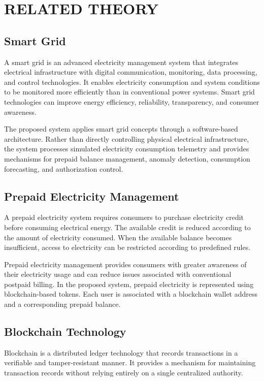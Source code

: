 \chapter{RELATED THEORY}

\section{Smart Grid}

A smart grid is an advanced electricity management system that integrates electrical infrastructure with digital communication, monitoring, data processing, and control technologies. It enables electricity consumption and system conditions to be monitored more efficiently than in conventional power systems. Smart grid technologies can improve energy efficiency, reliability, transparency, and consumer awareness.

The proposed system applies smart grid concepts through a software-based architecture. Rather than directly controlling physical electrical infrastructure, the system processes simulated electricity consumption telemetry and provides mechanisms for prepaid balance management, anomaly detection, consumption forecasting, and authorization control.


\section{Prepaid Electricity Management}

A prepaid electricity system requires consumers to purchase electricity credit before consuming electrical energy. The available credit is reduced according to the amount of electricity consumed. When the available balance becomes insufficient, access to electricity can be restricted according to predefined rules.

Prepaid electricity management provides consumers with greater awareness of their electricity usage and can reduce issues associated with conventional postpaid billing. In the proposed system, prepaid electricity is represented using blockchain-based tokens. Each user is associated with a blockchain wallet address and a corresponding prepaid balance.


\section{Blockchain Technology}

Blockchain is a distributed ledger technology that records transactions in a verifiable and tamper-resistant manner. It provides a mechanism for maintaining transaction records without relying entirely on a single centralized authority.

